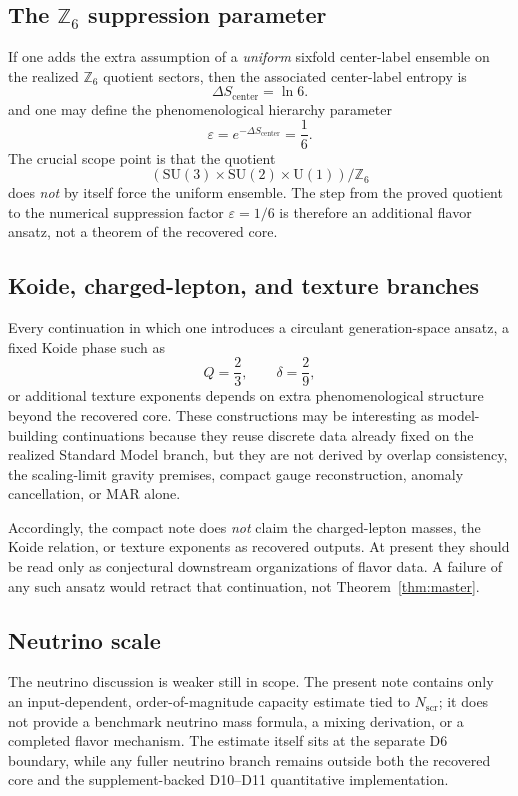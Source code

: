 \documentclass[11pt]{article}
\newcommand{\SU}{\mathrm{SU}}
\newcommand{\U}{\mathrm{U}}
\begin{document}
\subsection{The $\mathbb Z_6$ suppression parameter}\label{subsec:z6-suppression}

If one adds the extra assumption of a \emph{uniform} sixfold center-label ensemble on the realized $\mathbb Z_6$ quotient sectors, then the associated center-label entropy is
\[
\Delta S_{\mathrm{center}}=\ln 6.
\]
and one may define the phenomenological hierarchy parameter
\[
\varepsilon=e^{-\Delta S_{\mathrm{center}}}=\frac16.
\]
The crucial scope point is that the quotient
\[
(\SU(3)\times\SU(2)\times\U(1))/\mathbb Z_6
\]
does \emph{not} by itself force the uniform ensemble. The step from the proved quotient to the numerical suppression factor $\varepsilon=1/6$ is therefore an additional flavor ansatz, not a theorem of the recovered core.

\subsection{Koide, charged-lepton, and texture branches}

Every continuation in which one introduces a circulant generation-space ansatz, a fixed Koide phase such as
\[
Q=\frac23,\qquad \delta=\frac29,
\]
or additional texture exponents depends on extra phenomenological structure beyond the recovered core.
These constructions may be interesting as model-building continuations because they reuse discrete data already fixed on the realized Standard Model branch, but they are not derived by overlap consistency, the scaling-limit gravity premises, compact gauge reconstruction, anomaly cancellation, or MAR alone.

Accordingly, the compact note does \emph{not} claim the charged-lepton masses, the Koide relation, or texture exponents as recovered outputs. At present they should be read only as conjectural downstream organizations of flavor data. A failure of any such ansatz would retract that continuation, not Theorem~\ref{thm:master}.

\subsection{Neutrino scale}

The neutrino discussion is weaker still in scope. The present note contains only an input-dependent, order-of-magnitude capacity estimate tied to $N_{\mathrm{scr}}$; it does not provide a benchmark neutrino mass formula, a mixing derivation, or a completed flavor mechanism. The estimate itself sits at the separate D6 boundary, while any fuller neutrino branch remains outside both the recovered core and the supplement-backed D10--D11 quantitative implementation.
\end{document}
